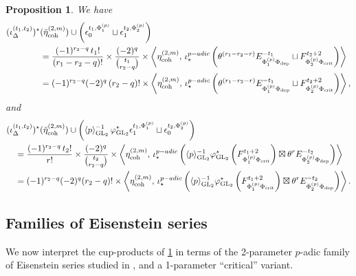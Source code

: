 \documentclass[cjm]{ipart}
\theoremstyle{plain}
\newtheorem{proposition}[theorem]{Proposition}
\theoremstyle{remark}
\DeclareMathOperator{\coh}{coh}
\DeclareMathOperator{\crit}{crit}
\DeclareMathOperator{\GL}{GL}
\newcommand{\dep}{\mathrm{dep}}
\numberwithin{equation}{subsection}
\begin{document}
   \begin{proposition}
    \label{prop:linktoLPSZ}
    We have
    \begin{align*}
       (\iota^{(t_1,t_2)}_\Delta)^\star&(\breve\eta^{(2,m)}_{\coh})\cup \left(\epsilon^{t_1,\Phi^{(p)}_1}_0\sqcup \epsilon^{t_2,\Phi^{(p)}_2}_1\right)\\
       & =\frac{(-1)^{r_2-q}\,t_1!}{(r_1-r_2-q)!}\times \frac{(-2)^q}{\tbinom{t_1}{r_2-q}}\times \left\langle \eta^{(2,m)}_{\coh},\,\iota^{p-adic}_\star\left( \theta^{(r_1-r_2-r)}E^{-t_1}_{\Phi_1^{(p)}\Phi_{\dep}}\sqcup F^{t_2+2}_{\Phi^{(p)}_2\Phi_{\crit}}\right)\right\rangle\\
       & = (-1)^{r_2-q}(-2)^q\, (r_2-q)!\times \left\langle \eta^{(2,m)}_{\coh},\,\iota^{p-adic}_\star\left( \theta^{(r_1-r_2-r)}E^{-t_1}_{\Phi_1^{(p)}\Phi_{\dep}}\sqcup F^{t_2+2}_{\Phi^{(p)}_2\Phi_{\crit}}\right)\right\rangle,
      \end{align*}
    and
    \begin{align*}
    &(\iota^{(t_1,t_2)}_\Delta)^\star(\breve\eta^{(2,m)}_{\coh})\cup \left( \langle p\rangle_{\GL_2}^{-1}\, \varphi_{\GL_2}^\star\epsilon^{t_1,\Phi^{(p)}_1}_1\sqcup \epsilon^{t_2,\Phi^{(p)}_2}_0\right)\\
    &\quad =\frac{(-1)^{r_2-q}\, t_2!}{r!}\times \frac{(-2)^q}{\tbinom{t_2}{r_2-q}}\times \left\langle \eta^{(2,m)}_{\coh},\,\iota^{p-adic}_\star\left( \langle p\rangle_{\GL_2}^{-1}\varphi_{\GL_2}^\star\left(F^{t_1+2}_{\Phi^{(p)}_1\Phi_{\crit}}\right)\boxtimes \theta^{r}E^{-t_2}_{\Phi^{(p)}_2\Phi_{\dep}}\right)\right\rangle\\
    & \quad = (-1)^{r_2-q}(-2)^q(r_2-q)!\times \left\langle \eta^{(2,m)}_{\coh},\,\iota^{p-adic}_\star\left( \langle p\rangle_{\GL_2}^{-1}\varphi_{\GL_2}^\star\left(F^{t_1+2}_{\Phi^{(p)}_1\Phi_{\crit}}\right)\boxtimes \theta^{r}E^{-t_2}_{\Phi^{(p)}_2\Phi_{\dep}}\right)\right\rangle.
   \end{align*}
   \end{proposition}




 \subsection{Families of Eisenstein series}

  We now interpret the cup-products of \cref{prop:linktoLPSZ} in terms of the 2-parameter $p$-adic family of Eisenstein series studied in \cite{LPSZ1}, and a 1-parameter ``critical'' variant.
\end{document}
